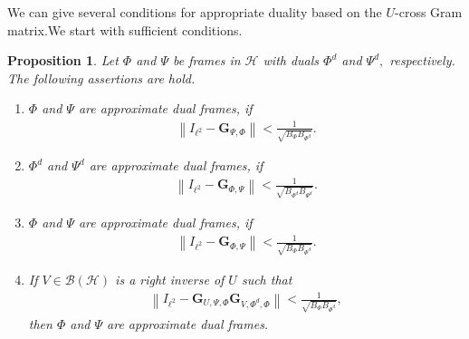 \documentclass{birkjour}
\newtheorem{prop}[thm]{Proposition}
\theoremstyle{definition}
\theoremstyle{remark}
\numberwithin{equation}{section}
\newcommand{\BL}[1]{
{\mathcal B} \left( #1 \right)
}
\begin{document}
We can give several conditions for appropriate duality based on the $U$-cross Gram matrix.We start with sufficient conditions. 
\begin{prop} \label{prop:approxdualsuff}
Let $\Phi$ and $\Psi$ be frames in $\mathcal{H}$ with duals
$\Phi^{d}$ and $\Psi^d,$ respectively. The following assertions
are hold.
\begin{enumerate}
\item[(1)]  $\Phi$ and $\Psi$ are approximate dual frames, if
\begin{eqnarray}\label{app3}
\left\|I_{\ell^{2}}-\mathbf{G}_{\Psi,\Phi}\right\|<
\frac{1}{\sqrt{B_{\Phi}B_{\Phi^d}}}.
\end{eqnarray}
\item[(2)]  $\Phi^d$ and $\Psi^d$ are approximate dual frames, if
\begin{eqnarray}\label{app4}
\left\|I_{\ell^{2}}-\mathbf{G}_{\Phi,\Psi}\right\|<
\frac{1}{\sqrt{B_{\Phi^d}B_{\Psi^d}}}.
\end{eqnarray}
\item[(3)]   $\Phi$ and $\Psi$ are approximate dual frames, if
\begin{eqnarray}\label{app5}
\left\|I_{\ell^{2}}-\mathbf{G}_{\Phi,\Psi}\right\|<
\frac{1}{\sqrt{B_{\Phi}B_{\Phi^d}}}.
\end{eqnarray}
\item[(4)]  If $V\in \BL{\mathcal{H}}$ is a right inverse of $U$ such
that
\begin{eqnarray}\label{app6}
\left\|I_{\ell^{2}}-\mathbf{G}_{U,\Psi,\Phi}\mathbf{G}_{V,\Phi^{d},\Phi}\right\|< \frac{1}{\sqrt{B_{\Phi}B_{\Phi^d}}}, 
\end{eqnarray}
then $\Phi$ and $\Psi$ are approximate dual frames. 
\end{enumerate}
\end{prop}
\end{document}
